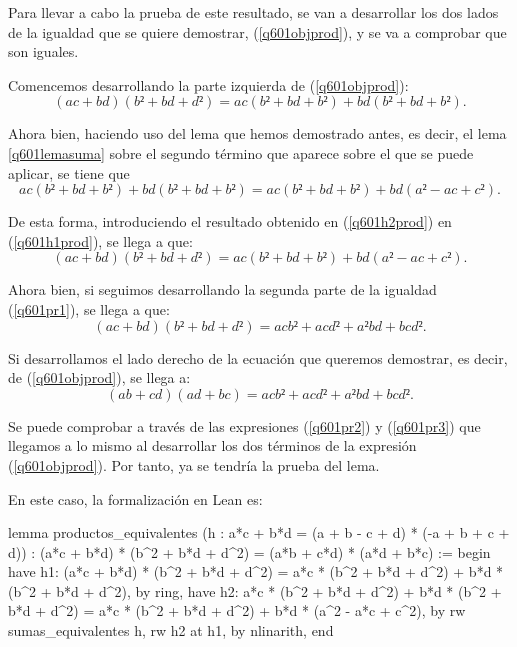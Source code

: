 \begin{demostracion}
  Para llevar a cabo la prueba de este resultado, se van a desarrollar los
  dos lados de la igualdad que se quiere demostrar, (\ref{q601objprod}),
  y se va a comprobar que son iguales.

  Comencemos desarrollando la parte izquierda de (\ref{q601objprod}):
  \begin{equation}\label{q601h1prod}\tag{h1}
    (ac+bd)(b²+bd+d²)=ac(b²+bd+b²)+bd(b²+bd+b²).
  \end{equation}

  Ahora bien, haciendo uso del lema que hemos demostrado antes, es decir,
  el lema \ref{q601lemasuma} sobre el segundo término que aparece sobre
  el que se puede aplicar, se tiene que
  \begin{equation}\label{q601h2prod}\tag{h2}
    ac(b²+bd+b²)+bd(b²+bd+b²)=ac(b²+bd+b²)+bd(a²-ac+c²).
  \end{equation}

  De esta forma, introduciendo el resultado obtenido en (\ref{q601h2prod})
  en (\ref{q601h1prod}), se llega a que:
  \begin{equation}\label{q601pr1}
     (ac+bd)(b²+bd+d²)=ac(b²+bd+b²)+bd(a²-ac+c²).
  \end{equation}

  Ahora bien, si seguimos desarrollando la segunda parte de la igualdad
  (\ref{q601pr1}), se llega a que:
  \begin{equation}\label{q601pr2}
     (ac+bd)(b²+bd+d²)= acb²+acd²+a²bd+bcd².
  \end{equation}

   Si desarrollamos el lado derecho de la ecuación que queremos demostrar,
   es decir, de (\ref{q601objprod}), se llega a:
   \begin{equation}\label{q601pr3}
     (ab+cd)(ad+bc)= acb²+acd²+a²bd+bcd².
   \end{equation}

   Se puede comprobar a través de las expresiones (\ref{q601pr2}) y
   (\ref{q601pr3}) que llegamos a lo mismo al desarrollar los dos términos
   de la expresión (\ref{q601objprod}). Por tanto, ya se tendría la
   prueba del lema.
\end{demostracion}

En este caso, la formalización en Lean es:
\begin{leancode}
lemma productos_equivalentes
  (h : a*c + b*d = (a + b - c + d) * (-a + b + c + d))
  : (a*c + b*d) * (b^2 + b*d + d^2) = (a*b + c*d) * (a*d + b*c) :=
begin
  have h1: (a*c + b*d) * (b^2 + b*d + d^2) =
           a*c * (b^2 + b*d + d^2) + b*d * (b^2 + b*d + d^2),
    by ring,
  have h2: a*c * (b^2 + b*d + d^2) + b*d * (b^2 + b*d + d^2) =
           a*c * (b^2 + b*d + d^2) + b*d * (a^2 - a*c + c^2),
    by rw sumas_equivalentes h,
  rw h2 at h1,
  by nlinarith,
end
\end{leancode}

